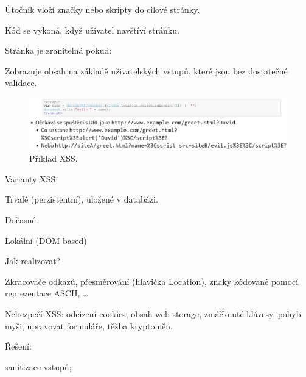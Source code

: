 \begin{compactitem}
    \item Útočník vloží značky nebo skripty do cílové stránky. \begin{compactitem}
        \item Kód se vykoná, když uživatel navštíví stránku.
    \end{compactitem}

    \item Stránka je zranitelná pokud: \begin{compactitem}
        \item Zobrazuje obsah na základě uživatelských vstupů, které jsou bez dostatečné validace.
    \end{compactitem}

    \begin{figure}[H]
        \centering
        \includegraphics[width=1\linewidth]{xss_priklad.pdf}
        \caption{Příklad XSS.}
    \end{figure}

    \item Varianty XSS: \begin{compactitem}
        \item Trvalé (perzistentní), uložené v databázi.
        \item Dočasné.
        \item Lokální (DOM based)
    \end{compactitem}

    \item Jak realizovat? \begin{compactitem}
        \item Zkracovače odkazů, přesměrování (hlavička Location), znaky kódované pomocí reprezentace ASCII, \ldots
    \end{compactitem}

    \item Nebezpečí XSS: odcizení cookies, obsah web storage, zmáčknuté klávesy, pohyb myši, upravovat formuláře, těžba kryptoměn.

    \item Řešení: \begin{compactitem}
        \item sanitizace vstupů;


\end{compactitem}
\end{compactitem}
